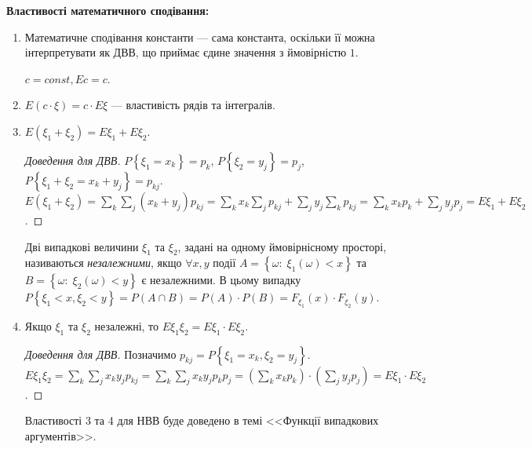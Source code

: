 \noindent \textbf{Властивості математичного сподівання:}
\begin{enumerate}
    \item Математичне сподівання константи --- сама константа, оскільки
    її можна інтерпретувати як ДВВ, що приймає єдине значення з ймовірністю $1$.
    
    $c = const, E c = c$.
    \item $E \left(c\cdot\xi\right) = c\cdot E\xi$ --- властивість рядів та інтегралів.
    \item $E\left( \xi_1 + \xi_2\right) = E\xi_1 + E\xi_2$.
    \begin{proof}[Доведення для ДВВ]
        $P\left\{\xi_1 = x_k\right\} = p_k$, $P\left\{\xi_2 = y_j\right\} = p_j$, $P\left\{\xi_1 + \xi_2 = x_k + y_j\right\} = p_{kj}$.
        $E\left( \xi_1 + \xi_2\right) = \sum\limits_k \sum\limits_j (x_k+y_j) p_{kj} =
        \sum\limits_k x_k \sum\limits_j p_{kj} + \sum\limits_j y_j \sum\limits_k p_{kj} = \sum\limits_k x_k p_k + \sum\limits_j y_j p_j = E\xi_1 + E\xi_2$.
    \end{proof}
\begin{definition}
    Дві випадкові величини $\xi_1$ та $\xi_2$, задані на одному ймовірнісному просторі, називаються \emph{незалежними}, якщо
    $\forall x, y$ події $A=\left\{\omega : \; \xi_1(\omega) < x\right\}$ та
    $B=\left\{\omega : \; \xi_2(\omega) < y\right\}$ є незалежними.
    В цьому випадку $P\left\{\xi_1 < x, \xi_2 < y\right\} = P(A \cap B) = P(A)\cdot P(B) = F_{\xi_1}(x)\cdot F_{\xi_2}(y)$.
\end{definition}
    \item Якщо $\xi_1$ та $\xi_2$ незалежні, то $E\xi_1\xi_2 = E\xi_1 \cdot E\xi_2$.
    \begin{proof}[Доведення для ДВВ]
        Позначимо $p_{kj} = P\left\{\xi_1 = x_k, \xi_2 = y_j\right\}$.
        $E\xi_1\xi_2 = \sum\limits_k \sum\limits_j x_k y_j p_{kj} = \sum\limits_k \sum\limits_j x_k y_j p_k p_j = \left( \sum\limits_k x_k p_k\right)\cdot \left( \sum\limits_j y_j p_j\right) = E\xi_1 \cdot E\xi_2$.
    \end{proof}
    Властивості 3 та 4 для НВВ буде доведено в темі <<Функції випадкових аргументів>>.
\end{enumerate}

